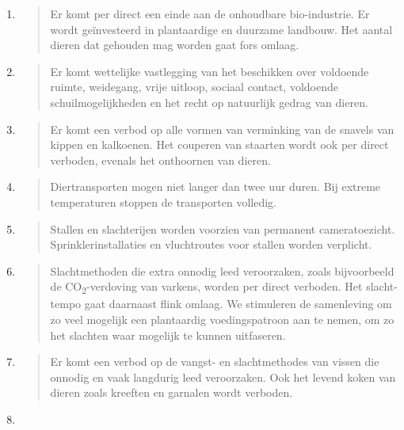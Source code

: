 \begin{enumerate}
\def\labelenumi{\arabic{enumi}.}
\item
  \begin{quote}
  Er komt per direct een einde aan de onhoudbare bio-industrie. Er wordt
  geïnvesteerd in plantaardige en duurzame landbouw. Het aantal dieren
  dat gehouden mag worden gaat fors omlaag.
  \end{quote}
\item
  \begin{quote}
  Er komt wettelijke vastlegging van het beschikken over voldoende
  ruimte, weidegang, vrije uitloop, sociaal contact, voldoende
  schuilmogelijkheden en het recht op natuurlijk gedrag van dieren.
  \end{quote}
\item
  \begin{quote}
  Er komt een verbod op alle vormen van verminking van de snavels van
  kippen en kalkoenen. Het couperen van staarten wordt ook per direct
  verboden, evenals het onthoornen van dieren.
  \end{quote}
\item
  \begin{quote}
  Diertransporten mogen niet langer dan twee uur duren. Bij extreme
  temperaturen stoppen de transporten volledig.
  \end{quote}
\item
  \begin{quote}
  Stallen en slachterijen worden voorzien van permanent cameratoezicht.
  Sprinklerinstallaties en vluchtroutes voor stallen worden verplicht.
  \end{quote}
\item
  \begin{quote}
  Slachtmethoden die extra onnodig leed veroorzaken, zoals bijvoorbeeld
  de CO\textsubscript{2}-verdoving van varkens, worden per direct
  verboden. Het slacht-tempo gaat daarnaast flink omlaag. We stimuleren
  de samenleving om zo veel mogelijk een plantaardig voedingspatroon aan
  te nemen, om zo het slachten waar mogelijk te kunnen uitfaseren.
  \end{quote}
\item
  \begin{quote}
  Er komt een verbod op de vangst- en slachtmethodes van vissen die
  onnodig en vaak langdurig leed veroorzaken. Ook het levend koken van
  dieren zoals kreeften en garnalen wordt verboden.
  \end{quote}
\item

\end{enumerate}
